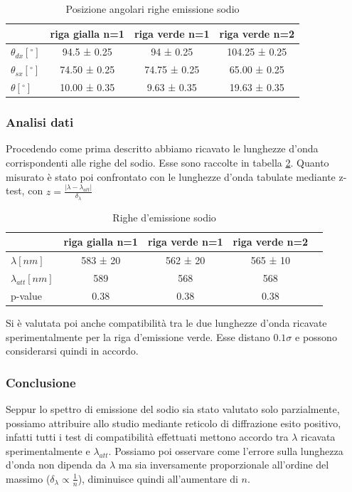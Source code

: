 \documentclass[a4paper]{article}
\begin{document}
\begin{table}[htbp]
\centering
\begin{tabular}{|l|c|c|c|}
\hline
 & riga gialla n=1 & riga verde n=1 & riga verde n=2 \\\hline
$\theta_{dx} [^\circ] $ & 94.5 ± 0.25 & 94 ± 0.25 & 104.25 ± 0.25  \\\hline
$\theta_{sx} [^\circ]$ &74.50 ± 0.25 & 74.75 ± 0.25 & 65.00 ± 0.25 \\\hline
$\theta [^\circ]$ &  10.00 ± 0.35 & 9.63 ± 0.35 & 19.63 ± 0.35 \\\hline
\end{tabular}
\caption{Posizione angolari righe emissione sodio}
\label{tab:angoli.sodio}
\end{table}

\subsubsection{Analisi dati}
Procedendo come prima descritto abbiamo ricavato le lunghezze d'onda corrispondenti alle righe del sodio. Esse sono raccolte in tabella \ref{tab:lunghezza_d'onda.sodio}. Quanto misurato è stato poi confrontato con le lunghezze d'onda tabulate mediante z-test, con $z=\frac{|\lambda-\lambda_{att}|}{\delta_{\lambda}}$

\begin{table}[htbp]
\centering
\begin{tabular}{|l|c|c|c|c|}
\hline
 & riga gialla n=1 & riga verde n=1 & riga verde n=2  \\\hline
$\lambda [nm] $ & 583 ± 20 & 562 ± 20 & 565 ± 10 \\\hline
$\lambda_{att} [nm]$ & 589 & 568 & 568 \\\hline
p-value & 0.38 & 0.38 & 0.38 \\\hline
\end{tabular}
\caption{Righe d'emissione sodio}
\label{tab:lunghezza_d'onda.sodio}
\end{table}

Si è valutata poi anche compatibilità tra le due lunghezze d'onda ricavate sperimentalmente per la riga d'emissione verde. Esse distano $0.1\sigma$ e possono considerarsi quindi in accordo.

\subsubsection{Conclusione}
Seppur lo spettro di emissione del sodio sia stato valutato solo parzialmente, possiamo attribuire allo studio mediante reticolo di diffrazione esito positivo, infatti tutti i test di compatibilità effettuati mettono accordo tra $\lambda$ ricavata sperimentalmente e $\lambda_{att}$. Possiamo poi osservare come l'errore sulla lunghezza d'onda non dipenda da $\lambda$ ma sia inversamente proporzionale all'ordine del massimo ($\delta_{\lambda} \propto \frac{1}{n}$), diminuisce quindi all'aumentare di $n$. 
\end{document}

